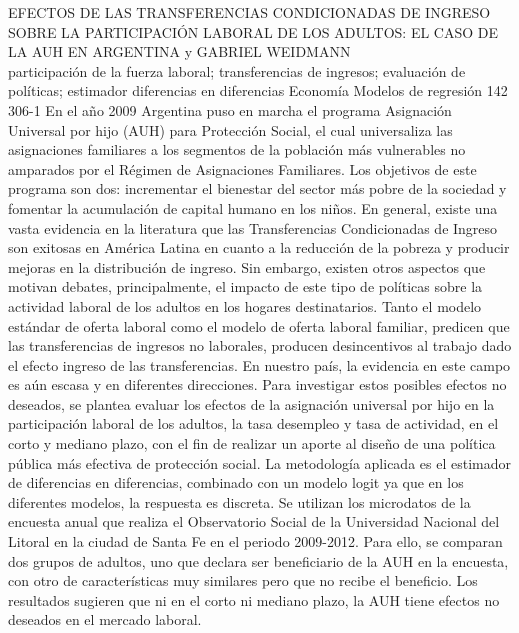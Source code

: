 \A
{EFECTOS DE LAS TRANSFERENCIAS CONDICIONADAS DE INGRESO SOBRE LA PARTICIPACIÓN LABORAL DE LOS ADULTOS: EL CASO DE LA AUH EN ARGENTINA}
{ y GABRIEL WEIDMANN}
{
\\}
{participación de la fuerza laboral; transferencias de ingresos; evaluación de políticas; estimador diferencias en diferencias} 
 {Economía} 
 {Modelos de regresión} 
 {142} 
 {306-1}
{En el año 2009 Argentina puso en marcha el programa Asignación Universal por hijo (AUH) para Protección Social, el cual universaliza las asignaciones familiares a los segmentos de la población más vulnerables no amparados por el Régimen de Asignaciones Familiares. Los objetivos de este programa son dos: incrementar el bienestar del sector más pobre de la sociedad y fomentar la acumulación de capital humano en los niños. En general, existe una vasta evidencia en la literatura que las Transferencias Condicionadas de Ingreso son exitosas en América Latina en cuanto a la reducción de la pobreza y producir mejoras en la distribución de ingreso. Sin embargo, existen otros aspectos que motivan debates, principalmente, el impacto de este tipo de políticas sobre la actividad laboral de los adultos en los hogares destinatarios. Tanto el modelo estándar de oferta laboral como el modelo de oferta laboral familiar, predicen que las transferencias de ingresos no laborales, producen desincentivos al trabajo dado el efecto ingreso de las transferencias. En nuestro país, la evidencia en este campo es aún escasa y en diferentes direcciones. Para investigar estos posibles efectos no deseados, se plantea evaluar los efectos de la asignación universal por hijo en la participación laboral de los adultos, la tasa desempleo y tasa de actividad, en el corto y mediano plazo, con el fin de realizar un aporte al diseño de una política pública más efectiva de protección social. La metodología aplicada es el estimador de diferencias en diferencias, combinado con un modelo logit ya que en los diferentes modelos, la respuesta es discreta. Se utilizan los microdatos de la encuesta anual que realiza el Observatorio Social de la Universidad Nacional del Litoral en la ciudad de Santa Fe en el periodo 2009-2012. Para ello, se comparan dos grupos de adultos, uno que declara ser beneficiario de la AUH en la encuesta, con otro de características muy similares pero que no recibe el beneficio. Los resultados sugieren que ni en el corto ni mediano plazo, la AUH tiene efectos no deseados en el mercado laboral.}
